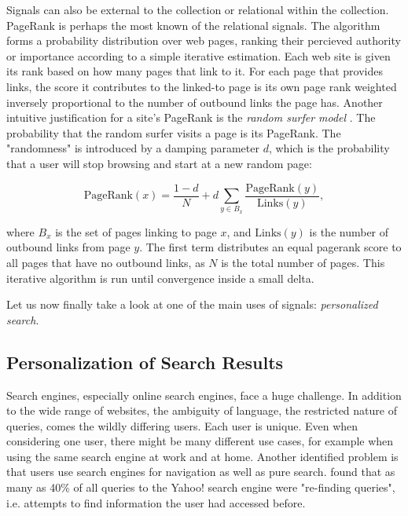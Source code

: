 Signals can also be external to the collection or relational within the collection.
PageRank \cite[p4]{Bender2005} is perhaps the most known of the relational signals.
The algorithm forms a probability distribution over web pages, ranking their percieved
authority or importance according to a simple iterative estimation.
Each web site is given its rank based on how many pages that link to it.
For each page that provides links, the score it contributes to the linked-to page is 
its own page rank weighted inversely proportional to the number of outbound links the page has.
Another intuitive justification for a site's PageRank is the \emph{random surfer model} \cite[p4]{Bender2005}.
The probability that the random surfer visits a page is its PageRank. The "randomness" is introduced 
by a damping parameter $d$, which is the probability that a user will stop browsing and start at a new random page:

\begin{equation*}
  \mathrm{PageRank}(x) = \frac{1 - d}{N} + d \sum_{y \in B_x} \frac{\mathrm{PageRank}(y)}{\mathrm{Links}(y)},
\end{equation*}

where $B_x$ is the set of pages linking to page $x$, and $\mathrm{Links}(y)$ is the number of outbound links from page $y$.
The first term distributes an equal pagerank score to all pages that have no outbound links, as $N$ is the total number of pages.
This iterative algorithm is run until convergence inside a small delta.

Let us now finally take a look at one of the main uses of signals: \emph{personalized search}.


\subsection{Personalization of Search Results}

Search engines, especially online search engines, face a huge challenge. 
In addition to the wide range of websites, the ambiguity of language,
the restricted nature of queries, comes the wildly differing users.
Each user is unique. Even when considering one user, there might be many 
different use cases, for example when using the same search engine at work and at home.
Another identified problem is that users use search engines for navigation as well as pure search.
\citet{Teevan2007} found that as many as 40\% of all queries to the Yahoo! search engine were "re-finding queries",
i.e. attempts to find information the user had accessed before.

